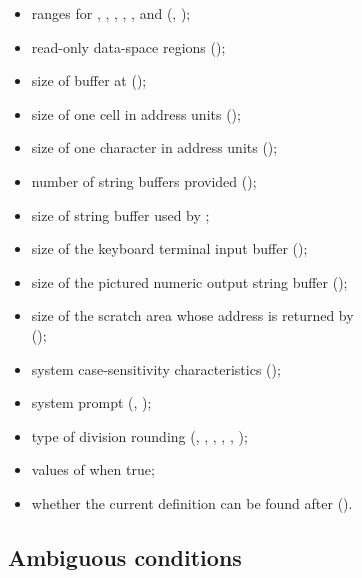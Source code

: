 \begin{itemize}
	();
%
\item ranges for , , , ,
	, and 
	(,
	 );
%
\item read-only data-space regions
	();
%
\item size of buffer at 
	();
%
\item size of one cell in address units
	();
%
\item size of one character in address units
	();
%
\item number of string buffers provided ();
%
\item size of string buffer used by ;
%
\item size of the keyboard terminal input buffer
	();
%
\item size of the pictured numeric output string buffer 
	();
%
\item size of the scratch area whose address is returned by
	 \\
	();
%
\item system case-sensitivity characteristics
	();
%
\item system prompt (,
	);
%
\item type of division rounding (,
	, , ,
	, );
%
\item values of  when true;
%
\item whether the current definition can be found after
	 ().

\end{itemize}


\subsection{Ambiguous conditions} %
\label{doc:ambiguous}

